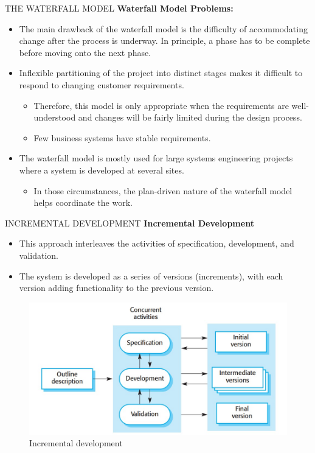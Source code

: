 \documentclass{beamer}
\begin{document}
\begin{frame}{THE WATERFALL MODEL}
\textbf{Waterfall Model Problems:}
\begin{itemize}
	\item The main drawback of the waterfall model is the difficulty of accommodating change after 
	the process is underway. In principle, a phase has to be complete before moving onto the 
	next phase.
	\item Inflexible partitioning of the project into distinct stages makes it difficult to respond to changing customer requirements.
	\begin{itemize}
		\item Therefore, this model is only appropriate when the requirements are well-understood and changes will be fairly limited during the design process. 
		\item Few business systems have stable requirements.
	\end{itemize}
\item The waterfall model is mostly used for large systems engineering projects where a 
system is developed at several sites.
\begin{itemize}
	\item In those circumstances, the plan-driven nature of the waterfall model helps 
	coordinate the work. 
	
\end{itemize}
\end{itemize}
\end{frame}
\begin{frame}{INCREMENTAL DEVELOPMENT}
\textbf{Incremental Development}
\begin{itemize}
	\item This approach interleaves the activities of specification, development, and validation. 
	\item The system is developed as a series of versions (increments), with each version adding functionality to the previous version.
\end{itemize}
	\begin{figure}
	\includegraphics[scale=.45]{img/m1_6.jpg}
	\caption{Incremental 
		development}
\end{figure}
\end{frame}
\end{document}
